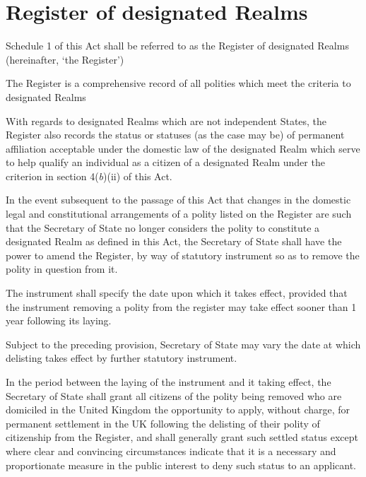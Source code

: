 \documentclass{ukbill}
\begin{document}
\section{Register of designated Realms}
\begin{numstat}
\item Schedule 1 of this Act shall be referred to as the Register of designated Realms (hereinafter, `the Register')
\begin{alphstat}
	\item The Register is a comprehensive record of all  polities which meet the criteria to designated Realms
	\item With regards to designated Realms which are not independent States, the Register also records the status or statuses (as the case may be) of permanent affiliation acceptable under the domestic law of the designated Realm which serve to help qualify an individual as a citizen of a designated Realm under the criterion in section 4(\emph{b})(ii) of this Act.
\end{alphstat}
\item  	In the event subsequent to the passage of this Act that changes in the domestic legal and constitutional arrangements of a polity listed on the Register are such that the Secretary of State no longer considers the polity to constitute a designated Realm as defined in this Act, the Secretary of State shall have the power to amend the Register, by way of statutory instrument  so as to remove the polity  in question from it.
\begin{alphstat}
	\item The instrument shall specify the date upon which it takes effect, provided that the instrument removing a polity from the register may take effect sooner than 1 year following its laying.
	\item Subject to the preceding provision, Secretary of State may vary the date at which delisting takes effect by further statutory instrument.
	\item In the period between the laying of the instrument and it taking effect, the Secretary of State shall grant all citizens of the polity being removed who are domiciled in the United Kingdom the opportunity to apply, without charge, for permanent settlement in the UK following the delisting of their polity of citizenship from the Register, and shall generally grant such settled status except where clear and convincing circumstances indicate that it is a  necessary and proportionate measure  in the public interest to deny such status to an applicant.
\end{alphstat}


\end{numstat}
\end{document}
